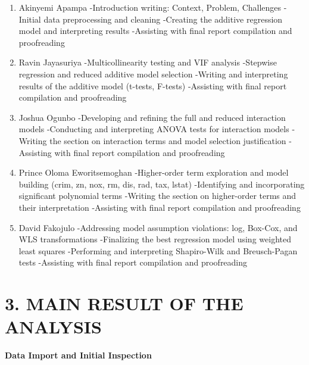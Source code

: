 \documentclass[
]{article}
\begin{document}
\begin{enumerate}
\def\labelenumi{\arabic{enumi}.}
\item
  Akinyemi Apampa -Introduction writing: Context, Problem, Challenges
  -Initial data preprocessing and cleaning -Creating the additive
  regression model and interpreting results -Assisting with final report
  compilation and proofreading
\item
  Ravin Jayasuriya -Multicollinearity testing and VIF analysis -Stepwise
  regression and reduced additive model selection -Writing and
  interpreting results of the additive model (t-tests, F-tests)
  -Assisting with final report compilation and proofreading
\item
  Joshua Ogunbo -Developing and refining the full and reduced
  interaction models -Conducting and interpreting ANOVA tests for
  interaction models -Writing the section on interaction terms and model
  selection justification -Assisting with final report compilation and
  proofreading
\item
  Prince Oloma Eworitsemoghan -Higher-order term exploration and model
  building (crim, zn, nox, rm, dis, rad, tax, lstat) -Identifying and
  incorporating significant polynomial terms -Writing the section on
  higher-order terms and their interpretation -Assisting with final
  report compilation and proofreading
\item
  David Fakojulo -Addressing model assumption violations: log, Box-Cox,
  and WLS transformations -Finalizing the best regression model using
  weighted least squares -Performing and interpreting Shapiro-Wilk and
  Breusch-Pagan tests -Assisting with final report compilation and
  proofreading
\end{enumerate}

\section{3. MAIN RESULT OF THE
ANALYSIS}\label{main-result-of-the-analysis}

\textbf{Data Import and Initial Inspection}
\end{document}
